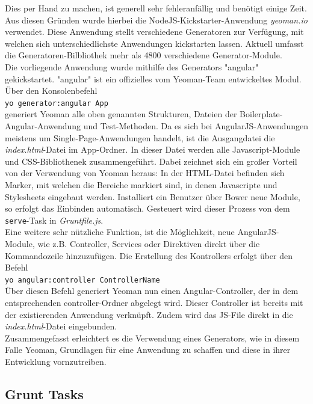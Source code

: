 Dies per Hand zu machen, ist generell sehr fehleranfällig und benötigt einige Zeit. Aus diesen Gründen wurde hierbei die NodeJS-Kickstarter-Anwendung \textit{yeoman.io} verwendet.
Diese Anwendung stellt verschiedene Generatoren zur Verfügung, mit welchen sich unterschiedlichste Anwendungen kickstarten lassen. Aktuell umfasst die Generatoren-Bilbliothek mehr als 4800 verschiedene
Generator-Module.\\
Die vorliegende Anwendung wurde mithilfe des Generators "angular" gekickstartet. "angular" ist ein offizielles vom Yeoman-Team entwickeltes Modul.
Über den Konsolenbefehl\\
\texttt{yo generator:angular App}\\
generiert Yeoman alle oben genannten Strukturen, Dateien der Boilerplate-Angular-Anwendung und Test-Methoden.
Da es sich bei AngularJS-Anwendungen meistens um Single-Page-Anwendungen handelt, ist die Ausgangdatei die \textit{index.html}-Datei im App-Ordner.
In dieser Datei werden alle Javascript-Module und CSS-Bibliothenek zusammengeführt. Dabei zeichnet sich ein großer Vorteil von der Verwendung von Yeoman heraus:
In der HTML-Datei befinden sich Marker, mit welchen die Bereiche markiert sind, in denen Javascripte und Stylesheets eingebaut werden. Installiert ein Benutzer über Bower neue Module, so erfolgt das Einbinden automatisch.
Gesteuert wird dieser Prozess von dem \texttt{serve}-Task in \textit{Gruntfile.js}.\\
Eine weitere sehr nützliche Funktion, ist die Möglichkeit, neue AngularJS-Module, wie z.B. Controller, Services oder Direktiven direkt über die Kommandozeile hinzuzufügen.
Die Erstellung des Kontrollers erfolgt über den Befehl \\
\texttt{yo angular:controller ControllerName}\\
Über diesen Befehl generiert Yeoman nun einen Angular-Controller, der in dem entsprechenden controller-Ordner abgelegt wird. Dieser Controller ist bereits mit der existierenden Anwendung
 verknüpft. Zudem wird das JS-File direkt in die \textit{index.html}-Datei eingebunden.\\
 Zusammengefasst erleichtert es die Verwendung eines Generators, wie in diesem Falle Yeoman, Grundlagen für eine Anwendung zu schaffen und diese in ihrer Entwicklung vornzutreiben.

\subsection{Grunt Tasks}

